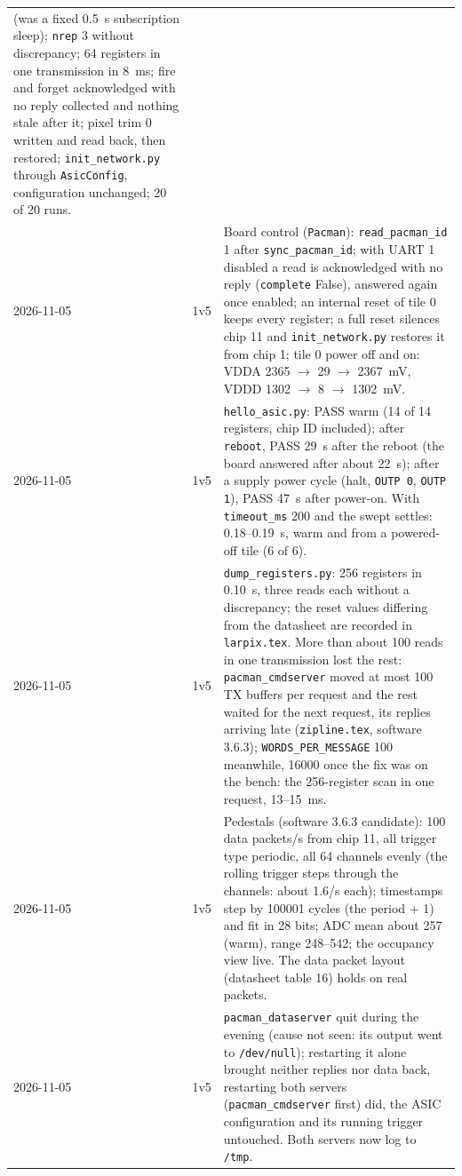 \documentclass[11pt]{article}
\newcommand{\h}[1]{\texttt{#1}}
\begin{document}
\begin{center}
\begin{tabularx}{\linewidth}{@{}llL@{}}
  (was a fixed 0.5~s subscription sleep);  \h{nrep} 3 without discrepancy;  64 registers in one transmission in
  8~ms;  fire and forget acknowledged with no reply collected and nothing stale after it;  pixel trim 0 written and
  read back, then restored;  \h{init\_network.py} through \h{AsicConfig}, configuration unchanged;  20 of 20 runs. \\
2026-11-05 & 1v5 & Board control (\h{Pacman}):  \h{read\_pacman\_id} 1 after \h{sync\_pacman\_id};  with UART 1
  disabled a read is acknowledged with no reply (\h{complete} False), answered again once enabled;  an internal
  reset of tile 0 keeps every register;  a full reset silences chip 11 and \h{init\_network.py} restores it from
  chip 1;  tile 0 power off and on:  VDDA 2365 $\to$ 29 $\to$ 2367~mV, VDDD 1302 $\to$ 8 $\to$ 1302~mV. \\
2026-11-05 & 1v5 & \h{hello\_asic.py}:  PASS warm (14 of 14 registers, chip ID included);  after \h{reboot}, PASS
  29~s after the reboot (the board answered after about 22~s);  after a supply power cycle (halt, \h{OUTP 0},
  \h{OUTP 1}), PASS 47~s after power-on.  With \h{timeout\_ms} 200 and the swept settles:  0.18--0.19~s, warm and
  from a powered-off tile (6 of 6). \\
2026-11-05 & 1v5 & \h{dump\_registers.py}:  256 registers in 0.10~s, three reads each without a discrepancy;  the
  reset values differing from the datasheet are recorded in \h{larpix.tex}.  More than about 100 reads in one
  transmission lost the rest:  \h{pacman\_cmdserver} moved at most 100 TX buffers per request and the rest waited
  for the next request, its replies arriving late (\h{zipline.tex}, software 3.6.3);  \h{WORDS\_PER\_MESSAGE} 100
  meanwhile, 16000 once the fix was on the bench:  the 256-register scan in one request, 13--15~ms. \\
2026-11-05 & 1v5 & Pedestals (software 3.6.3 candidate):  100 data packets/s from chip 11, all trigger type
  periodic, all 64 channels evenly (the rolling trigger steps through the channels:  about 1.6/s each);  timestamps
  step by 100001 cycles (the period + 1) and fit in 28 bits;  ADC mean about 257 (warm), range 248--542;  the
  occupancy view live.  The data packet layout (datasheet table 16) holds on real packets. \\
2026-11-05 & 1v5 & \h{pacman\_dataserver} quit during the evening (cause not seen:  its output went to
  \h{/dev/null});  restarting it alone brought neither replies nor data back, restarting both servers
  (\h{pacman\_cmdserver} first) did, the ASIC configuration and its running trigger untouched.  Both servers now
  log to \h{/tmp}. \\
\bottomrule
\end{tabularx}
\end{center}
\end{document}
